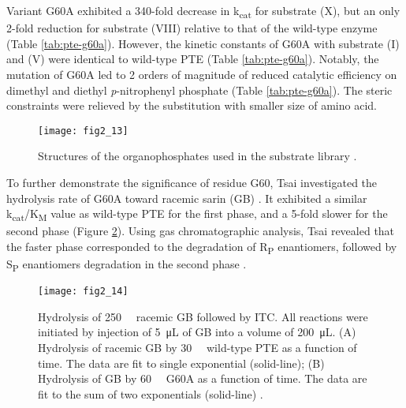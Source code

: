 \begin{refsection}
Variant G60A exhibited a 340-fold decrease in k\textsubscript{cat} for
substrate (X), but an only 2-fold reduction for substrate (VIII) relative to
that of the wild-type enzyme (Table \ref{tab:pte-g60a}). However, the kinetic
constants of G60A with substrate (I) and (V) were identical to wild-type PTE
\cite{Chen-Goodspeed2001a} (Table \ref{tab:pte-g60a}). Notably, the mutation of
G60A led to 2 orders of magnitude of reduced catalytic efficiency on dimethyl
and diethyl \emph{p}-nitrophenyl phosphate (Table \ref{tab:pte-g60a}). The steric
constraints were relieved by the substitution with smaller size of amino acid. 
\begin{figure}[htbp] \centering \texttt{[image: fig2\_13]}
    \caption[Structures of the organophosphates used in the substrate
    library.]{Structures of the organophosphates used in the substrate library
        \cite{Chen-Goodspeed2001a}.}
        \label{fig:op-library}
\end{figure}

To further demonstrate the significance of residue G60, Tsai 
investigated the hydrolysis rate of G60A toward racemic sarin (GB)
\cite{Tsai2010}. It exhibited a similar k\textsubscript{cat}/K\textsubscript{M}
value as wild-type PTE for the first phase, and a 5-fold slower for the second
phase \cite{Tsai2010} (Figure \ref{fig:g60a-gb}). Using gas chromatographic
analysis, Tsai  revealed that the faster phase corresponded to
the degradation of R\textsubscript{P} enantiomers, followed by
S\textsubscript{P} enantiomers degradation in the second phase \cite{Tsai2010}.
\begin{figure}[htbp] \centering \texttt{[image: fig2\_14]}
    \caption[Hydrolysis of \SI{250}{\micro\Molar} racemic GB followed by ITC.
        All reactions were initiated by injection of \SI{5}{\micro\liter} of GB
        into a volume of \SI{200}{\micro\liter}. (A) Hydrolysis of racemic GB by
        \SI{30}{\nano\Molar} wild-type PTE as a function of time. The data are
        fit to single exponential (solid-line); (B) Hydrolysis of GB by
        \SI{60}{\nano\Molar} G60A as a function of time. The data are fit to
    the sum of two exponentials (solid-line).]{Hydrolysis of
        \SI{250}{\micro\Molar} racemic GB followed by ITC.  All reactions were
        initiated by injection of \SI{5}{\micro\liter} of GB into a volume
        of \SI{200}{\micro\liter}. (A) Hydrolysis of racemic GB by
        \SI{30}{\nano\Molar} wild-type PTE as a function of time. The data are
        fit to single exponential (solid-line); (B) Hydrolysis of GB by
        \SI{60}{\nano\Molar} G60A as a function of time. The data are fit to
        the sum of two exponentials (solid-line) \cite{Tsai2010}.}
    \label{fig:g60a-gb}
\end{figure}


\end{refsection}
